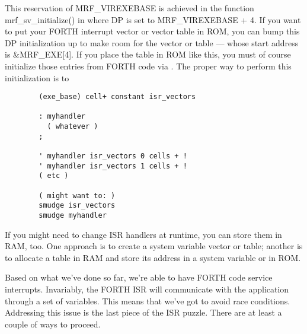 \documentclass{article}
\begin{document}
This reservation of MRF\_VIREXEBASE is achieved in the function
mrf\_sv\_initialize() in  where DP is set to
MRF\_VIREXEBASE + 4. If you want to put your FORTH interrupt vector or
vector table in ROM, you can bump this DP initialization up to make
room for the vector or table --- whose start address is
\&MRF\_EXE[4]. If you place the table in ROM like this, you must of
course initialize those entries from FORTH code via .
The proper way to perform this initialization is to
\begin{verbatim}
        (exe_base) cell+ constant isr_vectors

        : myhandler
          ( whatever )
        ;

        ' myhandler isr_vectors 0 cells + !
        ' myhandler isr_vectors 1 cells + !
        ( etc )

        ( might want to: )
        smudge isr_vectors
        smudge myhandler
\end{verbatim}
If you might need to change ISR handlers at runtime, you can store them
in RAM, too. One approach is to create a system variable vector or
table; another is to allocate a table in RAM and store its address in a
system variable or in ROM.

Based on what we've done so far, we're able to have FORTH code service
interrupts. Invariably, the FORTH ISR will communicate with the
application through a set of variables. This means that we've got to
avoid race conditions. Addressing this issue is the last piece of the
ISR puzzle. There are at least a couple of ways to proceed.
\end{document}
